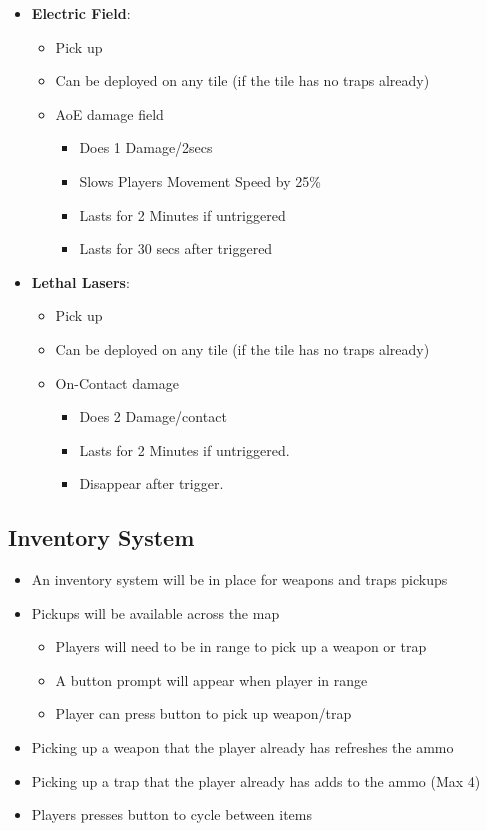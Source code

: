 \documentclass[11pt]{report}
\begin{document}
\begin{itemize}
    \item \textbf{Electric Field}:
    \begin{itemize}
        \item Pick up
        \item Can be deployed on any tile (if the tile has no traps already)
        \item AoE damage field
        \begin{itemize}
            \item Does 1 Damage/2secs
            \item Slows Players Movement Speed by 25\%
            \item Lasts for 2 Minutes if untriggered
            \item Lasts for 30 secs after triggered
        \end{itemize}
    \end{itemize}
    \item \textbf{Lethal Lasers}:
    \begin{itemize}
        \item Pick up
        \item Can be deployed on any tile (if the tile has no traps already)
        \item On-Contact damage
        \begin{itemize}
            \item Does 2 Damage/contact
            \item Lasts for 2 Minutes if untriggered.
            \item Disappear after trigger.
        \end{itemize}
    \end{itemize}
\end{itemize}

\subsection{Inventory System}

\begin{itemize}
    \item An inventory system will be in place for weapons and traps pickups
    \item Pickups will be available across the map 
    \begin{itemize}
        \item Players will need to be in range to pick up a weapon or trap
        \item A button prompt will appear when player in range
        \item Player can press button to pick up weapon/trap
    \end{itemize}
    \item Picking up a weapon that the player already has refreshes the ammo
    \item Picking up a trap that the player already has adds to the ammo (Max 4)
    \item Players presses button to cycle between items
\end{itemize}
\end{document}

